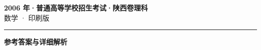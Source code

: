 \documentclass[zihao=5, a4paper]{ctexart}
\begin{document}
\begin{center}
  {\Large\bfseries 2006 年·普通高等学校招生考试·陕西卷理科}\\[4pt]
  {\large 数学 · 印刷版}
\end{center}
\medskip
{}

\par\bigskip\hrule\bigskip
{}
\begin{center}{\large\bfseries 参考答案与详细解析}\end{center}
\smallskip

\end{document}

